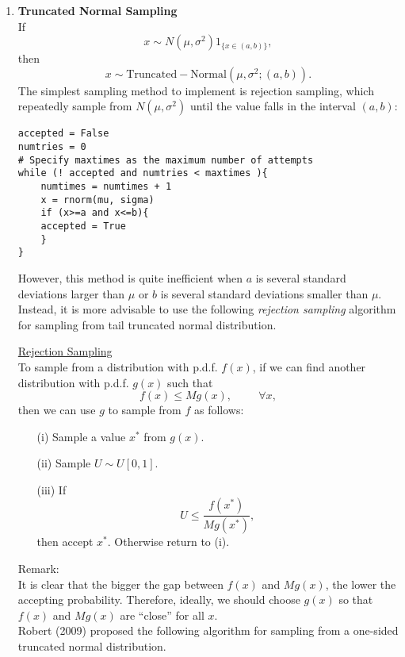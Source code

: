 \documentclass[11pt, oneside]{article}   	%
\begin{document}
\begin{enumerate}
\item \textbf{Truncated Normal Sampling}\vspace{0.2cm} \\
If 
\[
x\sim N(\mu, \sigma^2) 1_{\{x\in (a,b)\}},
\]
then
\[
x \sim \mathrm{Truncated-Normal}(\mu,\sigma^2;(a,b)).
\] 
The simplest sampling method to implement is rejection sampling, which repeatedly sample from $N(\mu, \sigma^2)$ until the value falls in the interval $(a,b)$:
\begin{verbatim}
accepted = False
numtries = 0
# Specify maxtimes as the maximum number of attempts
while (! accepted and numtries < maxtimes ){    
    numtimes = numtimes + 1
    x = rnorm(mu, sigma)
    if (x>=a and x<=b){
    accepted = True
    } 
}
\end{verbatim}
However, this method is quite inefficient when $a$ is several standard deviations larger than $\mu$ or $b$ is several standard deviations smaller than $\mu$. Instead, it is more advisable to use the following \emph{rejection sampling} algorithm for sampling from tail truncated normal distribution.

\underline{Rejection Sampling} \vspace{0.2cm}\\
To sample from a distribution with p.d.f. $f(x)$, if we can find another distribution with p.d.f. $g(x)$ such that 
\[
f(x)\leq Mg(x), \hspace{1cm} \forall x,
\]
then we can use $g$ to sample from $f$ as follows:
\begin{itemize}
\item[(i)] Sample a value $x^*$ from $g(x)$.
\item[(ii)] Sample $U\sim U[0,1]$.
\item[(iii)] If 
\[
U \leq \frac{f(x^*)}{Mg(x^*)},
\]
then accept $x^*$. Otherwise return to (i). 
\end{itemize}
Remark: \vspace{0.1cm}\\
It is clear that the bigger the gap between $f(x)$ and $Mg(x)$, the lower the accepting probability. Therefore, ideally, we should choose $g(x)$ so that $f(x)$ and $Mg(x)$ are ``close'' for all $x$.  \vspace{0.1cm}\\

Robert (2009) proposed the following algorithm for sampling from a one-sided truncated normal distribution.


\end{enumerate}
\end{document}
